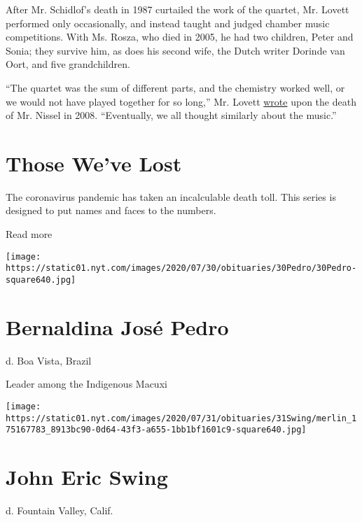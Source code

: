 After Mr. Schidlof's death in 1987 curtailed the work of the quartet,
Mr. Lovett performed only occasionally, and instead taught and judged
chamber music competitions. With Ms. Rosza, who died in 2005, he had two
children, Peter and Sonia; they survive him, as does his second wife,
the Dutch writer Dorinde van Oort, and five grandchildren.

``The quartet was the sum of different parts, and the chemistry worked
well, or we would not have played together for so long,'' Mr. Lovett
\href{https://www.theguardian.com/music/2008/may/23/classicalmusicandopera}{wrote}
upon the death of Mr. Nissel in 2008. ``Eventually, we all thought
similarly about the music.''

\href{https://www.nytimes.com/interactive/2020/obituaries/people-died-coronavirus-obituaries.html?action=click\&pgtype=Article\&state=default\&region=BELOW_MAIN_CONTENT\&context=covid_obits_promo}{}

\hypertarget{those-weve-lost}{%
\section{Those We've Lost}\label{those-weve-lost}}

The coronavirus pandemic has taken an incalculable death toll. This
series is designed to put names and faces to the numbers.

Read more

\texttt{[image: https://static01.nyt.com/images/2020/07/30/obituaries/30Pedro/30Pedro-square640.jpg]}

\hypertarget{bernaldina-josuxe9-pedro}{%
\section{Bernaldina José Pedro}\label{bernaldina-josuxe9-pedro}}

d. Boa Vista, Brazil

Leader among the Indigenous Macuxi

\texttt{[image: https://static01.nyt.com/images/2020/07/31/obituaries/31Swing/merlin\_175167783\_8913bc90-0d64-43f3-a655-1bb1bf1601c9-square640.jpg]}

\hypertarget{john-eric-swing}{%
\section{John Eric Swing}\label{john-eric-swing}}

d. Fountain Valley, Calif.

